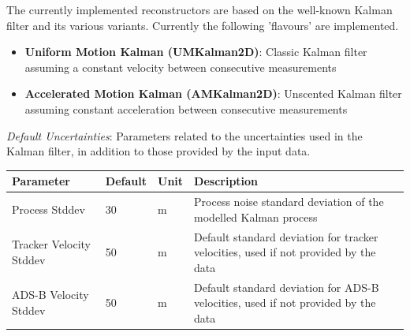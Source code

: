The currently implemented reconstructors are based on the well-known Kalman filter and its various variants.
Currently the following 'flavours' are implemented. \\

\begin{itemize}
    \item \textbf{Uniform Motion Kalman (UMKalman2D)}: 
        Classic Kalman filter assuming a constant velocity between consecutive measurements
    \item \textbf{Accelerated Motion Kalman (AMKalman2D)}: 
        Unscented Kalman filter assuming constant acceleration between consecutive measurements \\
\end{itemize}

\textit{Default Uncertainties}: Parameters related to the uncertainties used in the Kalman filter, in addition to those provided 
by the input data.
\begin{table}[H]
    \center
    \begin{tabularx}{\textwidth}{ | l | l | l | X |}
        \hline
        \textbf{Parameter} & \textbf{Default} & \textbf{Unit} & \textbf{Description} \\ \hline
        Process Stddev & 30 & m & Process noise standard deviation of the modelled Kalman process \\ \hline
        Tracker Velocity Stddev & 50 & m & Default standard deviation for tracker velocities, 
            used if not provided by the data \\ \hline
        ADS-B Velocity Stddev & 50 & m & Default standard deviation for ADS-B velocities, 
            used if not provided by the data \\ \hline
    \end{tabularx}
\end{table}

